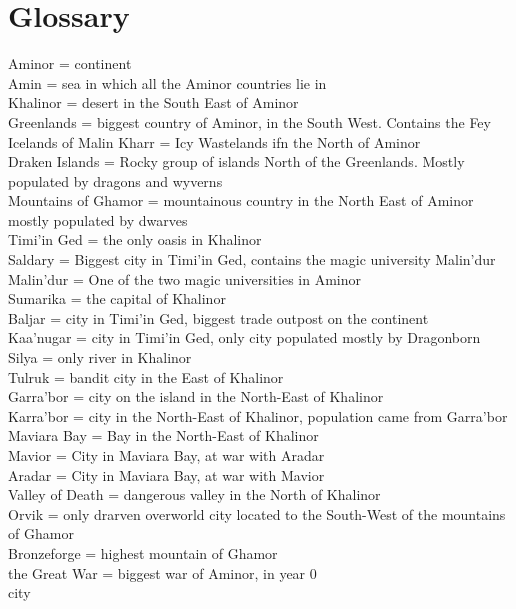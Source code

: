 \documentclass[oneside]{book}
\begin{document}
	\chapter{Glossary}
	Aminor = continent\\
	Amin = sea in which all the Aminor countries lie in\\
	Khalinor = desert in the South East of Aminor\\
	Greenlands = biggest country of Aminor, in the South West. Contains the Fey\\
	Icelands of Malin Kharr = Icy Wastelands ifn the North of Aminor\\
	Draken Islands = Rocky group of islands North of the Greenlands. Mostly populated by dragons and wyverns\\
	Mountains of Ghamor = mountainous country in the North East of Aminor mostly populated by dwarves\\
	Timi'in Ged = the only oasis in Khalinor\\
	Saldary = Biggest city in Timi'in Ged, contains the magic university Malin'dur\\
	Malin'dur = One of the two magic universities in Aminor\\
	Sumarika = the capital of Khalinor\\
	Baljar = city in Timi'in Ged, biggest trade outpost on the continent\\
	Kaa'nugar = city in Timi'in Ged, only city populated mostly by Dragonborn\\
	Silya = only river in Khalinor\\
	Tulruk = bandit city in the East of Khalinor\\
	Garra'bor = city on the island in the North-East of Khalinor\\
	Karra'bor = city in the North-East of Khalinor, population came from Garra'bor\\
	Maviara Bay = Bay in the North-East of Khalinor\\
	Mavior = City in Maviara Bay, at war with Aradar\\
	Aradar = City in Maviara Bay, at war with Mavior\\ 
	Valley of Death = dangerous valley in the North of Khalinor\\
	Orvik = only drarven overworld city located to the South-West of the mountains of Ghamor\\
	Bronzeforge = highest mountain of Ghamor\\
	the Great War = biggest war of Aminor, in year 0\\city
\end{document}
